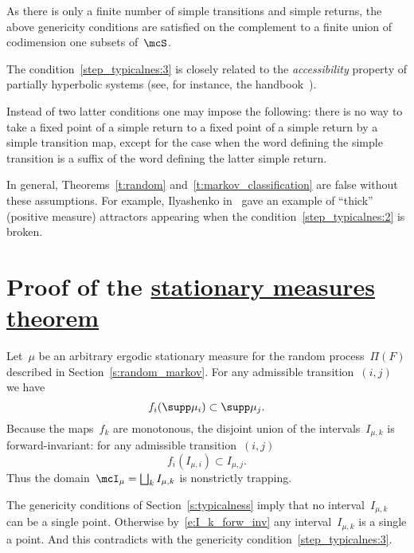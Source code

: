 \documentclass[a4paper,12pt]{amsart}
\begin{document}
\begin{Rem}
As there is only a finite number of simple transitions and simple returns, the above genericity conditions are satisfied on the complement to a finite union of codimension one subsets of~$\mcS$.
\end{Rem}
\begin{Rem}
The condition~\ref{step_typicalnes:3} is closely related to the \emph{accessibility} property of partially hyperbolic systems (see, for instance, the handbook~\cite{Barreira2006}).
\end{Rem}
\begin{Rem}
Instead of two latter conditions one may impose the following: there is no way to take a fixed point of a simple return to a fixed point of a simple return by a simple transition map, except for the case when the word defining the simple transition is a suffix of the word defining the latter simple return.
\end{Rem}

\begin{Rem}
  In general, Theorems~\ref{t:random} and~\ref{t:markov_classification} are false without these assumptions. For example, Ilyashenko in~\cite{Ilyashenko2010b} gave an example of ``thick'' (positive measure) attractors appearing when the condition~\ref{step_typicalnes:2} is broken.
\end{Rem}

\section{Proof of the \hyperref[t:random]{stationary measures theorem}}  \label{s:proof}

Let~$\mu$ be an arbitrary ergodic stationary measure for the random process~$\Pi(F)$ described in Section~\ref{s:random_markov}. For any admissible transition~$(i,j)$ we have
$$
f_{i} (\supp \mu_i) \subset \supp\mu_j.
$$
Because the maps~$f_k$ are monotonous, the disjoint union of the intervals~$I_{\mu,k}$ is forward-invariant: for any admissible transition~$(i,j)$
\begin{equation}    \label{e:I_k_forw_inv}
f_{i} (I_{\mu,i}) \subset I_{\mu,j}.
\end{equation}
Thus the domain~$\mcI_\mu = \bigsqcup_k I_{\mu,k}$ is nonstrictly trapping.

\begin{Rem}
The genericity conditions of Section~\ref{s:typicalness} imply that no interval~$I_{\mu,k}$ can be a single point. Otherwise by~\eqref{e:I_k_forw_inv} any interval~$I_{\mu,k}$ is a single a point. And this contradicts with the genericity condition~\ref{step_typicalnes:3}.
\end{Rem}
\end{document}
